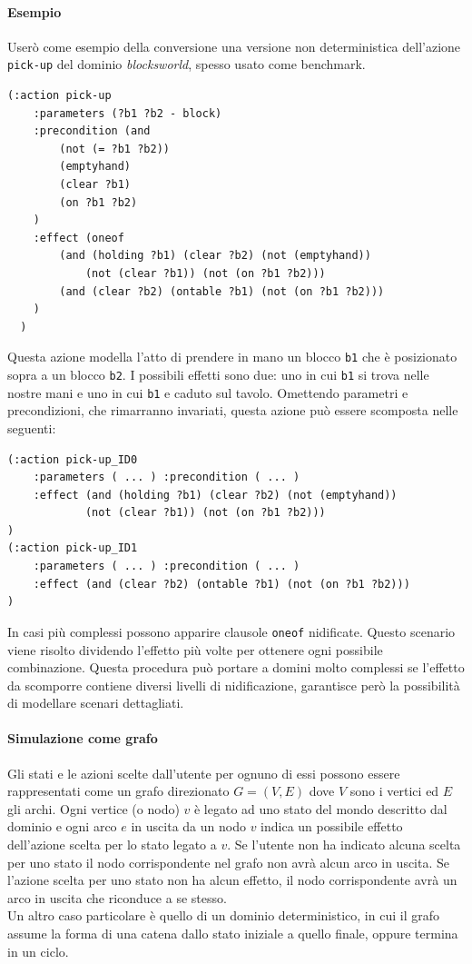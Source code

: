 \documentclass[a4paper, 11pt, titlepage, twoside, openany]{book}
\begin{document}
\paragraph{Esempio} Userò come esempio della conversione una versione non deterministica dell'azione \texttt{pick-up} del dominio \textit{blocksworld}, spesso usato come benchmark.
\begin{lstlisting}
(:action pick-up
    :parameters (?b1 ?b2 - block)
    :precondition (and 
        (not (= ?b1 ?b2))
        (emptyhand)
        (clear ?b1)
        (on ?b1 ?b2)
    )
    :effect (oneof
        (and (holding ?b1) (clear ?b2) (not (emptyhand))
            (not (clear ?b1)) (not (on ?b1 ?b2)))
        (and (clear ?b2) (ontable ?b1) (not (on ?b1 ?b2)))
    )
  )
\end{lstlisting}
Questa azione modella l'atto di prendere in mano un blocco \texttt{b1} che è posizionato sopra a un blocco \texttt{b2}. I possibili effetti sono due: uno in cui \texttt{b1} si trova nelle nostre mani e uno in cui \texttt{b1} e caduto sul tavolo.
Omettendo parametri e precondizioni, che rimarranno invariati, questa azione può essere scomposta nelle seguenti:
\begin{lstlisting}
(:action pick-up_ID0
    :parameters ( ... ) :precondition ( ... )
    :effect (and (holding ?b1) (clear ?b2) (not (emptyhand))
            (not (clear ?b1)) (not (on ?b1 ?b2)))
)
(:action pick-up_ID1
    :parameters ( ... ) :precondition ( ... )
    :effect (and (clear ?b2) (ontable ?b1) (not (on ?b1 ?b2)))
)
\end{lstlisting}
In casi più complessi possono apparire clausole \texttt{oneof} nidificate. Questo scenario viene risolto dividendo l'effetto più volte per ottenere ogni possibile combinazione. Questa procedura può portare a domini molto complessi se l'effetto da scomporre contiene diversi livelli di nidificazione, garantisce però la possibilità di modellare scenari dettagliati.

\paragraph{Simulazione come grafo} Gli stati e le azioni scelte dall'utente per ognuno di essi possono essere rappresentati come un grafo direzionato $G=(V,E)$ dove $V$ sono i vertici ed $E$ gli archi.
Ogni vertice (o nodo) $v$ è legato ad uno stato del mondo descritto dal dominio e ogni arco $e$ in uscita da un nodo $v$ indica un possibile effetto dell'azione scelta per lo stato legato a $v$. Se l'utente non ha indicato alcuna scelta per uno stato il nodo corrispondente nel grafo non avrà alcun arco in uscita. Se l'azione scelta per uno stato non ha alcun effetto, il nodo corrispondente avrà un arco in uscita che riconduce a se stesso. \\
Un altro caso particolare è quello di un dominio deterministico, in cui il grafo assume la forma di una catena dallo stato iniziale a quello finale, oppure termina in un ciclo.
\end{document}

